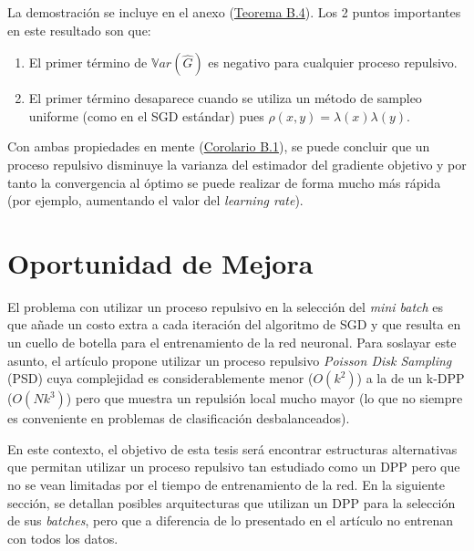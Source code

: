 La demostración se incluye en el anexo (\hyperlink{Teorema B.4}{Teorema B.4}). Los 2 puntos importantes en este resultado son que:
\begin{enumerate}
    \item El primer término de $\mathbb{V}ar(\hat{G})$ es negativo para cualquier proceso repulsivo.
    \item El primer término desaparece cuando se utiliza un método de sampleo uniforme (como en el SGD estándar) pues $\rho(x,y) = \lambda(x)\lambda(y)$. 
\end{enumerate}

Con ambas propiedades en mente (\hyperlink{Corolario B.1}{Corolario B.1}), se puede concluir que un proceso repulsivo disminuye la varianza del estimador del gradiente objetivo y por tanto la convergencia al óptimo se puede realizar de forma mucho más rápida (por ejemplo, aumentando el valor del \textit{learning rate}).

\section{Oportunidad de Mejora}

El problema con utilizar un proceso repulsivo en la selección del \textit{mini batch} es que añade un costo extra a cada iteración del algoritmo de SGD y que resulta en un cuello de botella para el entrenamiento de la red neuronal. Para soslayar este asunto, el artículo \cite{https://doi.org/10.48550/arxiv.1804.02772} propone utilizar un proceso repulsivo \textit{Poisson Disk Sampling} (PSD) cuya complejidad es considerablemente menor ($O(k^2)$) a la de un k-DPP ($O(Nk^3)$) pero que muestra un repulsión local mucho mayor \cite{Biscio_2016} (lo que no siempre es conveniente en problemas de clasificación desbalanceados). 


\vspace{0.2cm}

En este contexto, el objetivo de esta tesis será encontrar estructuras alternativas que permitan utilizar un proceso repulsivo tan estudiado como un DPP pero que no se vean limitadas por el tiempo de entrenamiento de la red. En la siguiente sección, se detallan posibles arquitecturas que utilizan un DPP para la selección de sus \textit{batches}, pero que a diferencia de lo presentado en el artículo \cite{https://doi.org/10.48550/arxiv.1804.02772} no entrenan con todos los datos. 





